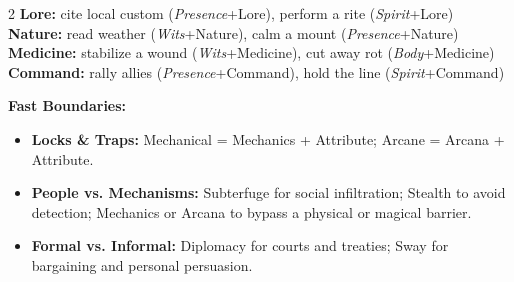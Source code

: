 \begin{tcolorbox}[title=Common Rolls (GM Screen Reference), colback=white!97!gray, colframe=black!80!gray,breakable]
\begin{multicols}{2}
\textbf{Lore:} cite local custom (\emph{Presence}+Lore), perform a rite (\emph{Spirit}+Lore)\\
\textbf{Nature:} read weather (\emph{Wits}+Nature), calm a mount (\emph{Presence}+Nature)\\
\textbf{Medicine:} stabilize a wound (\emph{Wits}+Medicine), cut away rot (\emph{Body}+Medicine)\\
\textbf{Command:} rally allies (\emph{Presence}+Command), hold the line (\emph{Spirit}+Command)
\end{multicols}
\vspace{0.5em}
\textbf{Fast Boundaries:}
\begin{itemize}
  \item \textbf{Locks \& Traps:} Mechanical = Mechanics + Attribute; Arcane = Arcana + Attribute.
  \item \textbf{People vs. Mechanisms:} Subterfuge for social infiltration; Stealth to avoid detection; Mechanics or Arcana to bypass a physical or magical barrier.
  \item \textbf{Formal vs. Informal:} Diplomacy for courts and treaties; Sway for bargaining and personal persuasion.
\end{itemize}
\end{tcolorbox}
